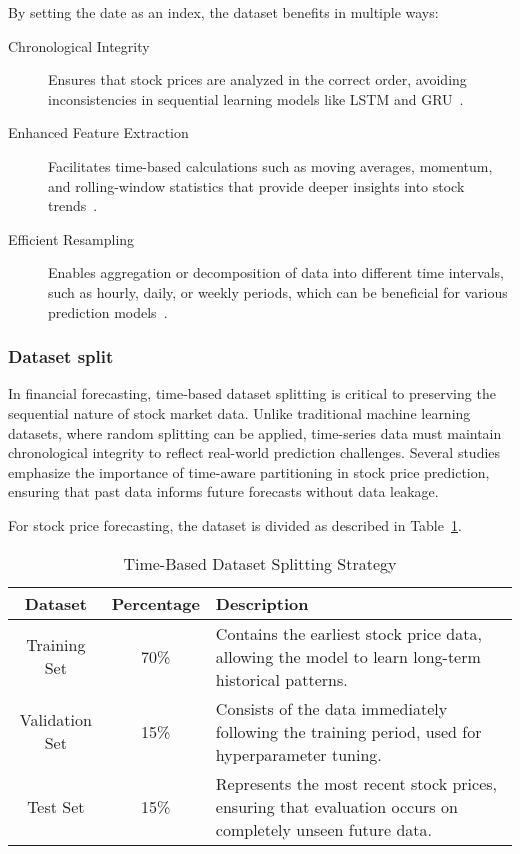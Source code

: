 By setting the date as an index, the dataset benefits in multiple ways:
\begin{description}
    \item[Chronological Integrity] Ensures that stock prices are analyzed in the correct order,
    avoiding inconsistencies in sequential learning models like LSTM and GRU~\parencite{guo2024LSTMStock}.
    \item[Enhanced Feature Extraction] Facilitates time-based calculations such as moving averages, 
    momentum, and rolling-window statistics that provide deeper insights into stock 
    trends~\parencite{shaban2024SMPDL}.
    \item[Efficient Resampling] Enables aggregation or decomposition of data into different time 
    intervals, such as hourly, daily, or weekly periods, which can be beneficial for various prediction 
    models~\parencite{agrawal2022StockPrediction}.
\end{description} 

\subsubsection{Dataset split}

In financial forecasting, time-based dataset splitting is critical to
preserving the sequential nature of stock market data. Unlike traditional
machine learning datasets, where random splitting can be applied, time-series
data must maintain chronological integrity to reflect real-world prediction
challenges. Several studies emphasize the importance of time-aware partitioning
in stock price prediction, ensuring that past data informs future forecasts
without data leakage.

For stock price forecasting, the dataset is divided as described 
in Table~\ref{tab:dataset_split}.

\begin{table}[H]
    \centering
    \caption{Time-Based Dataset Splitting Strategy}
    \label{tab:dataset_split}
    \begin{tabular}{ccp{9cm}}
        \hline
        \textbf{Dataset} & \textbf{Percentage} & \textbf{Description} \\
        \hline\hline
        Training Set & 70\% & Contains the earliest stock
        price data, allowing the model to learn long-term historical patterns. \\
        Validation Set & 15\% & Consists of the data immediately following 
        the training period, used for hyperparameter tuning. \\
        Test Set & 15\% & Represents the most recent stock prices, ensuring that 
        evaluation occurs on completely unseen future data. \\
        \hline
    \end{tabular}
\end{table}

